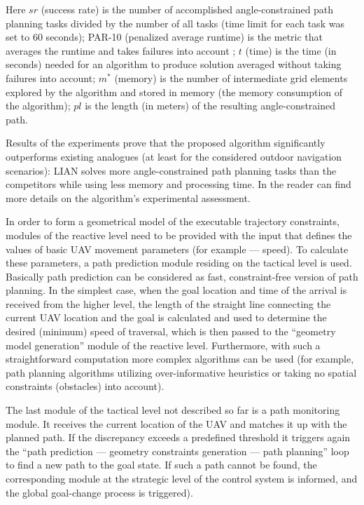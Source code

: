 \documentclass[review]{elsarticle}
\begin{document}
Here $sr$ (success rate) is the number of accomplished angle-constrained path planning tasks divided by the number of all tasks (time limit for each task was set to 60 seconds); PAR-10 (penalized average runtime) is the metric that averages the runtime and takes failures into account \cite{Hutter2009}; $t$ (time) is the time (in seconds) needed for an algorithm to produce solution averaged without taking failures into account; $m^*$ (memory) is the number of intermediate grid elements explored by the algorithm and stored in memory (the memory consumption of the algorithm); $pl$ is the length (in meters) of the resulting angle-constrained path.

Results of the experiments prove that the proposed algorithm significantly outperforms existing analogues (at least for the considered outdoor navigation scenarios): LIAN solves more angle-constrained path planning tasks than the competitors while using less memory and processing time. In \cite{Yakovlev2015b} the reader can find more details on the algorithm’s experimental assessment. 

In order to form a geometrical model of the executable trajectory constraints, modules of the reactive level need to be provided with the input that defines the values of basic UAV movement parameters (for example --- speed). To calculate these parameters, a path prediction module residing on the tactical level is used. Basically path prediction can be considered as fast, constraint-free version of path planning. In the simplest case, when the goal location and time of the arrival is received from the higher level, the length of the straight line connecting the current UAV location and the goal is calculated and used to determine the desired (minimum) speed of traversal, which is then passed to the ``geometry model generation'' module of the reactive level. Furthermore, with such a straightforward computation more complex algorithms can be used (for example, path planning algorithms utilizing over-informative heuristics or taking no spatial constraints (obstacles) into account).

The last module of the tactical level not described so far is a path monitoring module. It receives the current location of the UAV and matches it up with the planned path. If the discrepancy exceeds a predefined threshold it triggers again the ``path prediction --- geometry constraints generation --- path planning'' loop to find a new path to the goal state. If such a path cannot be found, the corresponding module at the strategic level of the control system is informed, and the global goal-change process is triggered). 
\end{document}
